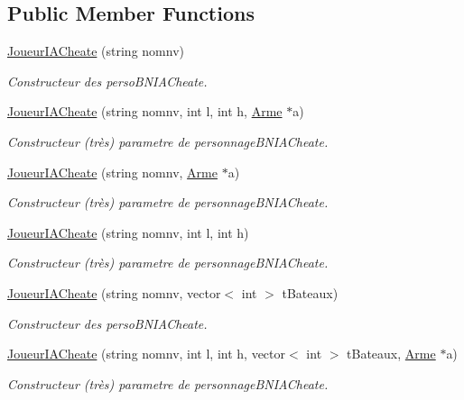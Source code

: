 \subsection*{Public Member Functions}
\begin{DoxyCompactItemize}
\item 
\hyperlink{classJoueurIACheate_a4a2bd65669ffbd12dbdaf7b41f99eb7f}{Joueur\-I\-A\-Cheate} (string nomnv)
\begin{DoxyCompactList}\small\item\em Constructeur des perso\-B\-N\-I\-A\-Cheate. \end{DoxyCompactList}\item 
\hyperlink{classJoueurIACheate_a0f8fea6f2048e5117eed084e721c5837}{Joueur\-I\-A\-Cheate} (string nomnv, int l, int h, \hyperlink{classArme}{Arme} $\ast$a)
\begin{DoxyCompactList}\small\item\em Constructeur (très) parametre de personnage\-B\-N\-I\-A\-Cheate. \end{DoxyCompactList}\item 
\hyperlink{classJoueurIACheate_a7b59ccf042ba34870d1aa5dd20adc500}{Joueur\-I\-A\-Cheate} (string nomnv, \hyperlink{classArme}{Arme} $\ast$a)
\begin{DoxyCompactList}\small\item\em Constructeur (très) parametre de personnage\-B\-N\-I\-A\-Cheate. \end{DoxyCompactList}\item 
\hyperlink{classJoueurIACheate_aef7db0a97f84a38195e234fddae1cdfd}{Joueur\-I\-A\-Cheate} (string nomnv, int l, int h)
\begin{DoxyCompactList}\small\item\em Constructeur (très) parametre de personnage\-B\-N\-I\-A\-Cheate. \end{DoxyCompactList}\item 
\hyperlink{classJoueurIACheate_a1a624700462855ce07e76d67635cf6d1}{Joueur\-I\-A\-Cheate} (string nomnv, vector$<$ int $>$ t\-Bateaux)
\begin{DoxyCompactList}\small\item\em Constructeur des perso\-B\-N\-I\-A\-Cheate. \end{DoxyCompactList}\item 
\hyperlink{classJoueurIACheate_a0f8cf02fd17baa904d8a2b481fa7923a}{Joueur\-I\-A\-Cheate} (string nomnv, int l, int h, vector$<$ int $>$ t\-Bateaux, \hyperlink{classArme}{Arme} $\ast$a)
\begin{DoxyCompactList}\small\item\em Constructeur (très) parametre de personnage\-B\-N\-I\-A\-Cheate. \end{DoxyCompactList}\item 

\end{DoxyCompactItemize}
